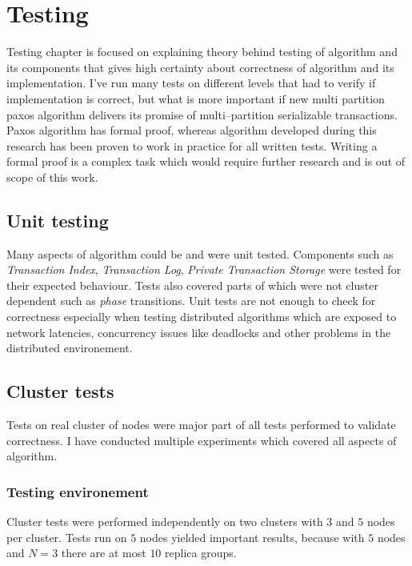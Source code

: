 
\chapter{Testing}\label{chapter:testing}

Testing chapter is focused on explaining theory behind testing of \mpp algorithm and its components that gives high certainty about correctness of algorithm and its implementation. I’ve run many tests on different levels that had to verify if implementation is correct, but what is more important if new multi partition paxos algorithm delivers its promise of multi--partition serializable transactions. 
Paxos algorithm has formal proof, whereas \mpp algorithm developed during this research has been proven to work in practice for all written tests. Writing a formal proof is a complex task which would require further research and is out of scope of this work.

\section{Unit testing}
Many aspects of algorithm could be and were unit tested. Components such as \emph{Transaction Index}, \emph{Transaction Log}, \emph{Private Transaction Storage} were  tested for their expected behaviour. Tests also covered parts of \mpp which were not cluster dependent such as \emph{phase} transitions. Unit tests are not enough to check for correctness especially when testing distributed algorithms which are  exposed to network latencies, concurrency issues like deadlocks and other problems in the distributed environement. 

\section{Cluster tests}
Tests on real cluster of nodes were major part of all tests performed to validate \mpp correctness. I have conducted multiple experiments which covered all aspects of \mpp algorithm. 

\subsection{Testing environement}
Cluster tests were performed independently on two clusters with $3$ and $5$ nodes per cluster. Tests run on $5$ nodes yielded important results, because with $5$ nodes and $N=3$ there are at most $10$ replica groups. 

